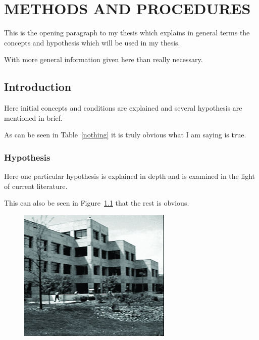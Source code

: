 \chapter{METHODS AND PROCEDURES}

This is the opening paragraph to my thesis which
explains in general terms the concepts and hypothesis
which will be used in my thesis.

With more general information given here than really
necessary.

\section{Introduction}

Here initial concepts and conditions are explained and
several hypothesis are mentioned in brief.

As can be seen in Table~\ref{nothing} it is truly
obvious what I am saying is true.

\begin{table}[h!tb] \centering

\label{nothing}

\vspace{ 2 in}
\end{table}

\subsection{Hypothesis}

Here one particular hypothesis is explained in depth
and is examined in the light of current literature.

This can also be seen in Figure~\ref{moon} that the
rest is obvious.

\begin{figure}[h!tb] \centering

\includegraphics[alt={Alt text describing}]{Images/dc5.jpg}
\label{moon}
\end{figure}

